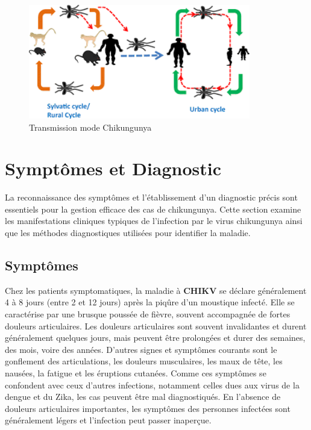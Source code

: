  
\begin{figure}[!h]
	\begin{center}
		\includegraphics[height=5cm]{images/trans}
	\end{center}
	\caption{Transmission mode Chikungunya}
	\label{fig:chikvtransmission}
\end{figure}
\newpage
\section{Symptômes et Diagnostic}
La reconnaissance des symptômes et l'établissement d'un diagnostic précis sont essentiels pour la gestion efficace des cas de chikungunya. Cette section examine les manifestations cliniques typiques de l'infection par le virus chikungunya ainsi que les méthodes diagnostiques utilisées pour identifier la maladie.
\subsection{Symptômes}
Chez les patients symptomatiques, la maladie à \textbf{CHIKV} se déclare généralement 4 à 8 jours (entre 2 et 12 jours) après la piqûre d'un moustique infecté. Elle se caractérise par une brusque poussée de fièvre, souvent accompagnée de fortes douleurs articulaires. Les douleurs articulaires sont souvent invalidantes et durent généralement quelques jours, mais peuvent être prolongées et durer des semaines, des mois, voire des années. D'autres signes et symptômes courants sont le gonflement des articulations, les douleurs musculaires, les maux de tête, les nausées, la fatigue et les éruptions cutanées. Comme ces symptômes se confondent avec ceux d'autres infections, notamment celles dues aux virus de la dengue et du Zika, les cas peuvent être mal diagnostiqués. En l'absence de douleurs articulaires importantes, les symptômes des personnes infectées sont généralement légers et l'infection peut passer inaperçue.

